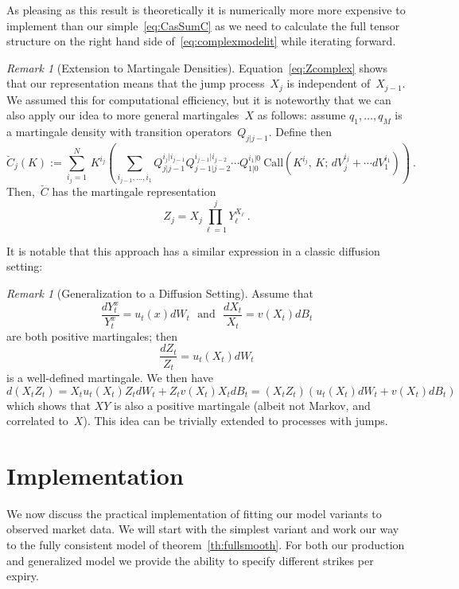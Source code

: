 \documentclass[twoside]{article}
\theoremstyle{plain}
\theoremstyle{definition}
\theoremstyle{remark}
\newtheorem{remark}[theorem]{Remark}
\begin{document}
As pleasing as this result is theoretically it is numerically more more
expensive to implement than our simple~\eqref{eq:CasSumC}
as we need to calculate the full tensor structure on the right hand side
of~\eqref{eq:complexmodelit} while iterating forward.

\begin{remark}[Extension to Martingale Densities]
    Equation~\eqref{eq:Zcomplex} shows that our representation means that the
    jump process~$X_j$ is independent of~$X_{j-1}$. We assumed this for computational
    efficiency, but it is noteworthy that we can also apply our idea to more general
    martingales~$X$ as follows: assume $q_1,\ldots,q_M$ is
    a martingale density with transition operators~$Q_{j|j-1}$. Define then
    \begin{equation}\label{eq:complexmodelitcond}
        \breve C_j(K) := \sum_{i_j=1}^N \,K^{i_j}
        \left( \sum_{i_{j-1},\ldots,i_1} Q_{j|j-1}^{i_j|i_{j-1}} Q_{j-1|j-2}^{i_{j-1}|i_{j-2}} \cdots Q^{i_1|0}_{1|0}
        \ \mathrm{Call}\!\left( K^{i_j},\,K;\, dV^{i_j}_j+\cdots dV^{i_1}_1 \right) 
        \right) \ .
    \end{equation}
    Then,~$\breve C$ has the martingale representation
    $$
        Z_j = X_j \prod_{\ell=1}^j Y_\ell^{X_\ell} \ .
    $$
\end{remark}    

\noindent
It is notable that this approach has a similar expression in a classic diffusion setting:

\begin{remark}[Generalization to a Diffusion Setting] Assume that
$$
    \frac{ dY^x_t }{ Y^x_t} = u_t(x) dW_t 
    \ \ \ \mbox{and} \ \ \ 
    \frac{ d X_t }{ X_t } = v(X_t) dB_t 
$$
are both positive martingales; then
$$
    \frac{ dZ_t }{ Z_t } = u_t(X_t) dW_t
$$
is a well-defined martingale. We then have
$$
     d(X_t Z_t)= X_t u_t(X_t) Z_t dW_t + Z_t v(X_t) X_t dB_t = (X_t Z_t) \left( u_t(X_t)dW_t + v(X_t)dB_t\right)
$$
which shows that $XY$ is also a positive martingale (albeit not Markov,
and correlated to~$X$). This idea can be trivially extended to processes with jumps.
\end{remark}


\section{Implementation}\label{sec:implementation}

We now discuss the practical implementation of fitting our model variants to observed market data. We will start with the
simplest variant and work our way to the fully consistent model of theorem~\ref{th:fullsmooth}. For both our production
and generalized model we provide the ability to specify different strikes per expiry.
\end{document}
